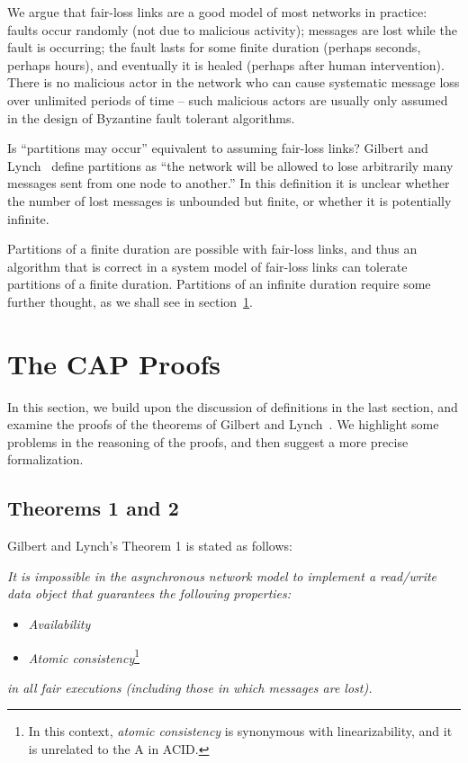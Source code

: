 \documentclass[a4paper,twocolumn,10pt]{article}
\begin{document}
We argue that fair-loss links are a good model of most networks in practice: faults occur randomly
(not due to malicious activity); messages are lost while the fault is occurring; the fault lasts for
some finite duration (perhaps seconds, perhaps hours), and eventually it is healed (perhaps after
human intervention). There is no malicious actor in the network who can cause systematic message
loss over unlimited periods of time -- such malicious actors are usually only assumed in the design
of Byzantine fault tolerant algorithms.

Is ``partitions may occur'' equivalent to assuming fair-loss links? Gilbert and
Lynch~\cite{Gilbert2002il} define partitions as ``the network will be allowed to lose arbitrarily
many messages sent from one node to another.'' In this definition it is unclear whether the number
of lost messages is unbounded but finite, or whether it is potentially infinite.

Partitions of a finite duration are possible with fair-loss links, and thus an algorithm that is
correct in a system model of fair-loss links can tolerate partitions of a finite duration.
Partitions of an infinite duration require some further thought, as we shall see in
section~\ref{sec:proofs}.

\section{The CAP Proofs}\label{sec:proofs}

In this section, we build upon the discussion of definitions in the last section, and examine the
proofs of the theorems of Gilbert and Lynch~\cite{Gilbert2002il}. We highlight some problems in the
reasoning of the proofs, and then suggest a more precise formalization.

\subsection{Theorems 1 and 2}\label{sec:theorem1}

Gilbert and Lynch's Theorem 1 is stated as follows:

\emph{It is impossible in the asynchronous network model to implement a read/write data object that
guarantees the following properties:}
\begin{itemize}
\item \emph{Availability}
\item \emph{Atomic consistency}\footnote{In this context, \emph{atomic consistency} is synonymous
with linearizability, and it is unrelated to the A in ACID.}
\end{itemize}
\emph{in all fair executions (including those in which messages are lost).}
\end{document}
